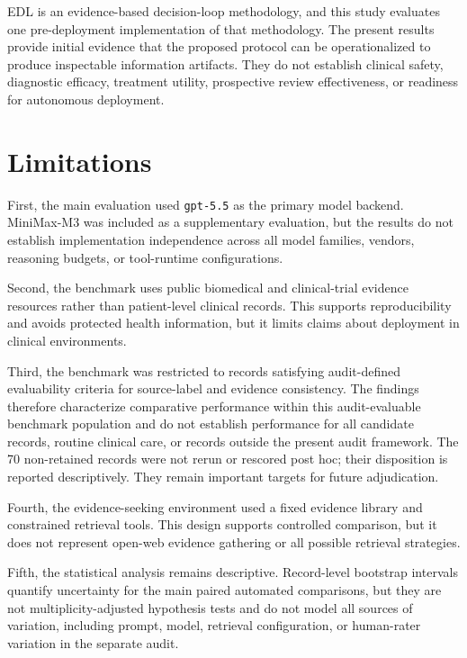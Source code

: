 \documentclass[11pt,a4paper]{article}
\begin{document}
EDL is an evidence-based decision-loop methodology, and this study evaluates one pre-deployment implementation of that methodology. The present results provide initial evidence that the proposed protocol can be operationalized to produce inspectable information artifacts. They do not establish clinical safety, diagnostic efficacy, treatment utility, prospective review effectiveness, or readiness for autonomous deployment.

\section{Limitations}

First, the main evaluation used \texttt{gpt-5.5} as the primary model backend. MiniMax-M3 was included as a supplementary evaluation, but the results do not establish implementation independence across all model families, vendors, reasoning budgets, or tool-runtime configurations.

Second, the benchmark uses public biomedical and clinical-trial evidence resources rather than patient-level clinical records. This supports reproducibility and avoids protected health information, but it limits claims about deployment in clinical environments.

Third, the benchmark was restricted to records satisfying audit-defined evaluability criteria for source-label and evidence consistency. The findings therefore characterize comparative performance within this audit-evaluable benchmark population and do not establish performance for all candidate records, routine clinical care, or records outside the present audit framework. The 70 non-retained records were not rerun or rescored post hoc; their disposition is reported descriptively. They remain important targets for future adjudication.

Fourth, the evidence-seeking environment used a fixed evidence library and constrained retrieval tools. This design supports controlled comparison, but it does not represent open-web evidence gathering or all possible retrieval strategies.

Fifth, the statistical analysis remains descriptive. Record-level bootstrap intervals quantify uncertainty for the main paired automated comparisons, but they are not multiplicity-adjusted hypothesis tests and do not model all sources of variation, including prompt, model, retrieval configuration, or human-rater variation in the separate audit.
\end{document}
